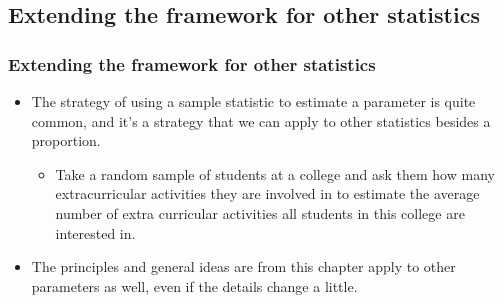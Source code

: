 
\subsection{Extending the framework for other statistics}


\begin{frame}
\frametitle{Extending the framework for other statistics}

\begin{itemize}

\item The strategy of using a sample statistic to estimate a parameter is quite common, and it's a strategy that we can apply to other statistics besides a proportion.

\begin{itemize}
\item Take a random sample of students at a college and ask them how many extracurricular activities they are involved in to estimate the average number of extra curricular activities all students in this college are interested in.
\end{itemize}

\item The principles and general ideas are from this chapter apply to other parameters as well, even if the details change a little. 

\end{itemize}

\end{frame}

